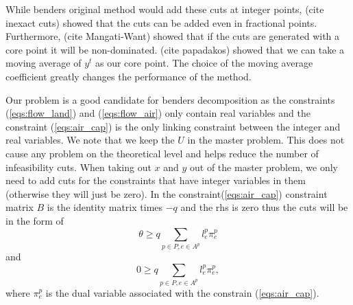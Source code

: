 \documentclass{article}
\begin{document}
	While benders original method would add these cuts at integer points, (cite inexact cuts) showed that the cuts can be added even in fractional points. Furthermore, (cite Mangati-Want) showed that if the cuts are generated with a core point it will be non-dominated. (cite papadakos) showed that we can take a moving average of $y^t$ as our core point. The choice of the moving average coefficient greatly changes the performance of the method.
	
	Our problem is a good candidate for benders decomposition as the constraints (\ref{eqs:flow_land}) and (\ref{eqs:flow_air}) only contain real variables and the constraint (\ref{eqs:air_cap}) is the only linking constraint between the integer and real variables. We note that we keep the $U$ in the master problem. This does not cause any problem on the theoretical level and helps reduce the number of infeasibility cuts. 
    When taking out $x$ and $y$ out of the master problem, we only need to add cuts for the constraints that have integer variables in them (otherwise they will just be zero). In the constraint(\ref{eqs:air_cap}) constraint matrix $B$ is the identity matrix times $-q$ and the rhs is zero thus the cuts will be in the form of 
	\begin{equation}
		\theta \geq q\sum_{p \in P, e \in A^p} l^p_e  \pi^p_e
	\end{equation}
	and
	\begin{equation}
		0 \geq q\sum_{p \in P, e \in A^p} l^p_e  \pi^p_e,
	\end{equation}
	where $ \pi^p_e$ is the dual variable associated with the constrain (\ref{eqs:air_cap}).
	
\end{document}

